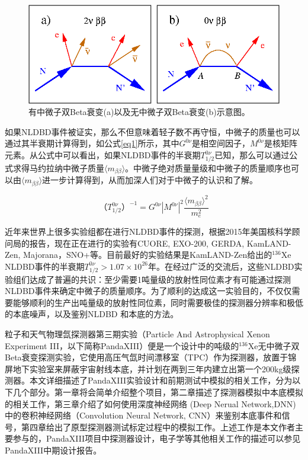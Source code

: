 \begin{figure}
    \centering
    \includegraphics[width=0.5\columnwidth]{pic/nldbd.png}
    \caption{有中微子双Beta衰变(a)以及无中微子双Beta衰变(b)示意图。}
    \label{fig:nldbd}
\end{figure}

如果NLDBD事件被证实，那么不但意味着轻子数不再守恒，中微子的质量也可以通过其半衰期计算得到，如公式\ref{eq1}所示\supercite{avignone2008double}，其中$G^{0\nu}$是相空间因子，$M^{0\nu}$是核矩阵元素。从公式中可以看出，如果NLDBD事件的半衰期$T^{0\nu}_{1/2}$已知，那么可以通过公式求得马约拉纳中微子质量$\langle m_{\beta\beta}\rangle$。中微子绝对质量量级和中微子的质量顺序也可以由$\langle m_{\beta\beta}\rangle$进一步计算得到，从而加深人们对于中微子的认识和了解。

\begin{equation}
    （T_{1/2}^{0\nu}）^{-1}=G^{0\nu}|M^{0\nu}|^2\frac{\langle m_{\beta\beta}\rangle ^2}{m_e^2}
    \label{eq1}
\end{equation}

近年来世界上很多实验组都在进行NLDBD事件的探测，根据2015年美国核科学顾问局的报告\supercite{NLDBD_NSAC}，现在正在进行的实验有CUORE\supercite{Artusa:2014lgv}, EXO-200\supercite{Albert:2014awa}, GERDA\supercite{Agostini:2016iid}, KamLAND-Zen\supercite{KamLAND-Zen:2016pfg}, Majorana\supercite{Abgrall:2013rze}，SNO+\supercite{Andringa:2015tza}等。目前最好的实验结果是KamLAND-Zen给出的$^{136}$Xe NLDBD事件的半衰期$T^{0\nu}_{1/2}>1.07\times10^{26}$年。在经过广泛的交流后，这些NLDBD实验组们达成了普遍的共识：至少需要1吨量级的放射性同位素才有可能通过探测NLDBD事件来确定中微子的质量顺序。为了顺利的达成这一实验目的，不仅仅需要能够顺利的生产出吨量级的放射性同位素，同时需要极佳的探测器分辨率和极低的本底噪声，以及鉴别NLDBD
和本底的方法。

粒子和天气物理氙探测器第三期实验（Particle And Astrophysical Xenon Experiment III，以下简称PandaXIII）便是一个设计中的吨级的$^{136}$Xe无中微子双Beta衰变探测实验，它使用高压气氙时间漂移室（TPC）作为探测器，放置于锦屏地下实验室来屏蔽宇宙射线本底，并计划在两到三年内建立出第一个200kg级探测器。本文详细描述了PandaXIII实验设计和前期测试中模拟的相关工作，分为以下几个部分。第一章将会简单介绍整个项目，第二章描述了探测器模拟中本底模拟的相关工作，第三章介绍了如何使用深度神经网络 (Deep Nerual Network,DNN) 中的卷积神经网络（Convolution Neural Network, CNN）来鉴别本底事件和信号，第四章给出了原型探测器测试标定过程中的模拟工作。上述工作是本文作者主要参与的，PandaXIII项目中探测器设计，电子学等其他相关工作的描述可以参见PandaXIII中期设计报告\supercite{cdr}。

